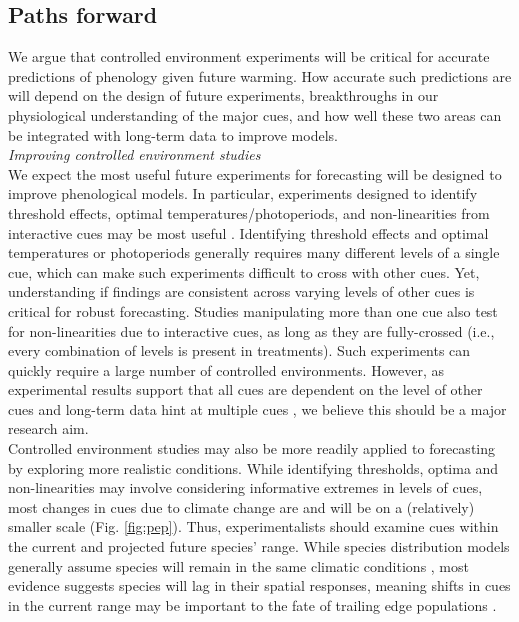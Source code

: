 \documentclass[11pt,letter]{article}
\begin{document}
\subsection{Paths forward} 
We argue that controlled environment experiments will be critical for accurate predictions of phenology given future warming. How accurate such predictions are will depend on the design of future experiments, breakthroughs in our physiological understanding of the major cues, and how well these two areas can be integrated with long-term data to improve models. \\

\emph{Improving controlled environment studies}\\
We expect the most useful future experiments for forecasting will be designed to improve phenological models. In particular, experiments designed to identify threshold effects,  optimal temperatures/photoperiods, and non-linearities from interactive cues may be most useful \citep{iler2013}. Identifying threshold effects and optimal temperatures or photoperiods generally requires many different levels of a single cue, which can make such experiments difficult to cross with other cues. Yet, understanding if findings are consistent across varying levels of other cues is critical for robust forecasting. Studies manipulating more than one cue also test for non-linearities due to interactive cues, as long as they are fully-crossed (i.e., every combination of levels is present in treatments). Such experiments can quickly require a large number of controlled environments. However, as experimental results support that all cues are dependent on the level of other cues \citep{stearns1958,flynn2018} and long-term data hint at multiple cues \citep{fu2015}, we believe this should be a major research aim.\\

Controlled environment studies may also be more readily applied to forecasting by exploring more realistic conditions. While identifying thresholds, optima and non-linearities may involve considering informative extremes in levels of cues, most changes in cues due to climate change are and will be on a (relatively) smaller scale (Fig. \ref{fig:pep}). Thus, experimentalists should examine cues within the current and projected future species' range. While species distribution models generally assume species will remain in the same climatic conditions \citep{elith2009species}, most evidence suggests species will lag in their spatial responses, meaning shifts in cues in the current range may be important to the fate of trailing edge populations \citep{bertrand2011changes,lenoir2015climate,savage2015elevational}. \\ %
\end{document}
